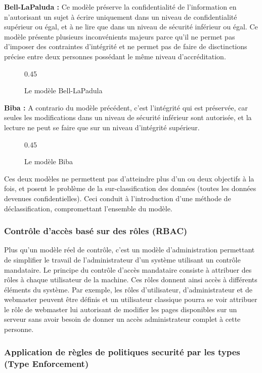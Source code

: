 \textbf{Bell-LaPaluda :} Ce modèle préserve la confidentialité de l'information en n'autorisant un sujet à écrire uniquement dans un niveau de confidentialité supérieur ou égal, et à ne lire que dans un niveau de sécurité inférieur ou égal. Ce modèle présente plusieurs inconvénients majeurs parce qu'il ne permet pas d'imposer des contraintes d'intégrité et ne permet pas de faire de disctinctions précise entre deux personnes possédant le même niveau d'accréditation.

\begin{figure}[h]
	\centering
	{0.45}
	\caption{Le modèle Bell-LaPadula}
\end{figure}

\textbf{Biba :} A contrario du modèle précédent, c'est l'intégrité qui est préservée, car seules les modifications dans un niveau de sécurité inférieur sont autorisée, et la lecture ne peut se faire que sur un niveau d'intégrité supérieur.

\begin{figure}[h]
	\centering
	{0.45}
	\caption{Le modèle Biba}
\end{figure}

Ces deux modèles ne permettent pas d'atteindre plus d'un ou deux objectifs à la fois, et posent le problème de la sur-classification des données (toutes les données devenues confidentielles). Ceci conduit à l'introduction d'une méthode de déclassification, compromettant l'ensemble du modèle.

\subsubsection{Contrôle d'accès basé sur des rôles (RBAC)}

Plus qu'un modèle réel de contrôle, c'est un modèle d'administration permettant de simplifier le travail de l'administrateur d'un système utilisant un contrôle mandataire. Le principe du contrôle d'accès mandataire consiste à attribuer des rôles à chaque utilisateur de la machine. Ces rôles donnent ainsi accès à différents éléments du système. Par exemple, les rôles d'utilisateur, d'administrateur et de webmaster peuvent être définis et un utilisateur classique pourra se voir attribuer le rôle de webmaster lui autorisant de modifier les pages disponibles sur un serveur sans avoir besoin de donner un accès administrateur complet à cette personne.

\subsubsection{Application de règles de politiques securité par les types (Type Enforcement)}

